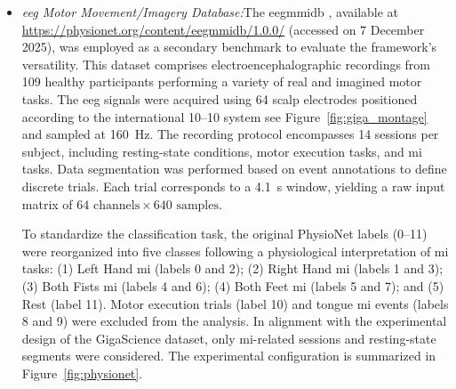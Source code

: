 \begin{itemize}
    \begin{figure}[htbp]
      \centering
      
      \resizebox{0.5\textwidth}{!}{}
      \caption{Sensor positions according the 10--20 electrode placement system for the \gls{bci} Competition IV 2a dataset. 22 channels are distributed over ten main brain regions:  Frontal left, Frontal, Frontal right, Central left, Central right, Centro-parietal left, Centro-parietal right, Parietal left, Parietal right, Posterior.}\label{fig:topoplot}
    \end{figure}
    
    \item[--] \textit{\gls{eeg} Motor Movement/Imagery Database:}The \gls{eegmmidb} \cite{physionet}, available at \url{https://physionet.org/content/eegmmidb/1.0.0/} (accessed on 7 December 2025), was employed as a secondary benchmark to evaluate the framework's versatility. This dataset comprises electroencephalographic recordings from 109 healthy participants performing a variety of real and imagined motor tasks. The \gls{eeg} signals were acquired using 64 scalp electrodes positioned according to the international 10--10 system see Figure~\ref{fig:giga_montage} and sampled at 160~Hz. The recording protocol encompasses 14 sessions per subject, including resting-state conditions, motor execution tasks, and \gls{mi} tasks. Data segmentation was performed based on event annotations to define discrete trials. Each trial corresponds to a 4.1~s window, yielding a raw input matrix of $64 \text{ channels} \times 640 \text{ samples}$. 
    
    To standardize the classification
    task, the original PhysioNet labels (0--11) were reorganized into five classes following a physiological interpretation of \gls{mi} tasks: (1) Left Hand \gls{mi} (labels 0 and 2); (2) Right Hand \gls{mi} (labels 1 and 3); (3) Both Fists \gls{mi} (labels 4 and 6); (4) Both Feet \gls{mi} (labels 5 and 7); and (5) Rest (label 11). Motor execution trials (label 10) and tongue \gls{mi} events (labels 8 and 9) were excluded from the analysis. In alignment with the experimental design of the GigaScience dataset, only \gls{mi}-related sessions and resting-state segments were considered. The experimental configuration is summarized in Figure~\ref{fig:physionet}.


\end{itemize}
